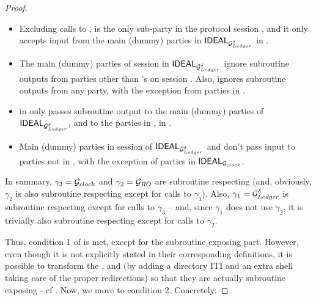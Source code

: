 \begin{proof}
  \begin{itemize}
  \item Excluding calls to \IdealGclock, \IdealGdledger is the only sub-party in
    the protocol session \sid, and it only accepts input from the main (dummy)
    parties in $\mathsf{IDEAL}_{\mathcal{G}_{Ledger}^\delta}$ in \sid.
  \item The main (dummy) parties of session \sid in $\mathsf{IDEAL}_{\mathcal{G}_{Ledger}^\delta}$
    ignore subroutine outputs from parties other than \IdealGdledger's on
    session \sid. Also, \IdealGdledger ignores subroutine outputs from any
    party, with the exception from parties in \IdealGclock.
  \item \IdealGdledger in \sid only passes subroutine output to the main (dummy)
    parties of $\mathsf{IDEAL}_{\mathcal{G}_{Ledger}^\delta}$, and to the parties in \IdealGclock,
    in \sid.
  \item Main (dummy) parties in session \sid of $\mathsf{IDEAL}_{\mathcal{G}_{Ledger}^\delta}$ and
    \IdealGdledger don't pass input to parties not in \sid, with the exception
    of parties in $\mathsf{IDEAL}_{\mathcal{G}_{clock}}$.
  \end{itemize}


  In summary, $\gamma_3 = \mathcal{G}_{clock}$ and $\gamma_2 = \mathcal{G}_{RO}$ are
  subroutine respecting (and, obviously, $\gamma_2$ is also subroutine
  respecting except for calls to $\gamma_3$). Also, $\gamma_1 = \mathcal{G}_{Ledger}^\delta$
  is subroutine respecting except for calls to $\gamma_3$ -- and, since
  $\gamma_1$ does not use $\gamma_2$, it is trivially also subroutine respecting
  except for calls to $\gamma_2$.

  Thus, condition 1 of  is met, except for the subroutine
  exposing part. However, even though it is not explicitly stated in their
  corresponding definitions, it is possible to transform the \IdealGclock,
  \IdealGRO and \IdealGdledger (by adding a directory ITI and an extra shell
  taking care of the proper redirections) so that they are actually subroutine
  exposing - cf \cite[Definition 2.7]{bch+20}. Now, we move to condition 2.
  Concretely:


\end{proof}
